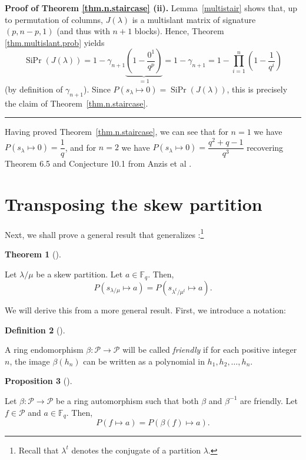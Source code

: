 \documentclass[numbers=enddot,12pt,final,onecolumn,notitlepage]{scrartcl}%
\theoremstyle{definition}
\newtheorem{theo}{Theorem}[section]
\newenvironment{theorem}[1][]
{\begin{theo}[#1]\begin{leftbar}}
{\end{leftbar}\end{theo}}
\newtheorem{prop}[theo]{Proposition}
\newenvironment{proposition}[1][]
{\begin{prop}[#1]\begin{leftbar}}
{\end{leftbar}\end{prop}}
\newtheorem{defi}[theo]{Definition}
\newenvironment{definition}[1][]
{\begin{defi}[#1]\begin{leftbar}}
{\end{leftbar}\end{defi}}
\newenvironment{proof}[1][Proof]{\noindent\textbf{#1.} }{\ \rule{0.5em}{0.5em}}
\let\prodnonlimits\prod
\renewcommand{\prod}{\prodnonlimits\limits}
\newcommand{\tup}[1]{\left( #1 \right)}
\theoremstyle{plainsl}
\begin{document}
\begin{proof}[Proof of Theorem \ref{thm.n.staircase} (ii)]
Lemma~\ref{multistair} shows that, up to permutation of columns,
$J(\lambda)$ is a multislant matrix of signature $(p, n-p, 1)$
(and thus with $n+1$ blocks).
Hence, Theorem \ref{thm.multislant.prob} yields
\[
\operatorname*{SiPr}\tup{J\tup{\lambda}}
= 1 - \gamma_{n+1} \underbrace{\tup{1 - \dfrac{0^1}{q^p}}}_{= 1}
= 1 - \gamma_{n+1}
= 1 - \prod_{i=1}^{n} \left(  1-\dfrac{1}{q^{i}}\right)
\]
(by definition of $\gamma_{n+1}$).
Since $P(s_{\lambda} \longmapsto 0) = \operatorname*{SiPr}\tup{J\tup{\lambda}}$,
this is precisely the claim of Theorem~\ref{thm.n.staircase}.
\end{proof}

Having proved Theorem~\ref{thm.n.staircase}, we can see that for $n=1$
we have
$P(s_{\lambda} \longmapsto 0) = \dfrac{1}{q}$, and for $n=2$ we have
$P(s_{\lambda} \longmapsto 0) = \dfrac{q^2+q-1}{q^3}$
recovering Theorem 6.5 and Conjecture 10.1 from Anzis et al \cite{Anzis18}.


\section{Transposing the skew partition}

Next, we shall prove a general result that generalizes \cite[Corollary
3.3]{Anzis18}:\footnote{Recall that $\lambda^{t}$ denotes the conjugate of a
partition $\lambda$.}

\begin{theorem}
\label{thm.transpose}Let $\lambda/\mu$ be a skew partition. Let $a\in
\mathbb{F}_{q}$. Then,
\[
P\left(  s_{\lambda/\mu}\mapsto a\right)  =P\left(  s_{\lambda^{t}/\mu^{t}%
}\mapsto a\right)  .
\]

\end{theorem}

We will derive this from a more general result. First, we introduce a notation:

\begin{definition}
A ring endomorphism $\beta:\mathcal{P}\rightarrow\mathcal{P}$ will be called
\emph{friendly} if for each positive integer $n$, the image $\beta\left(
h_{n}\right)  $ can be written as a polynomial in $h_{1},h_{2},\ldots,h_{n}$.
\end{definition}

\begin{proposition}
\label{prop.friendly-aut}Let $\beta:\mathcal{P}\rightarrow\mathcal{P}$ be a
ring automorphism such that both $\beta$ and $\beta^{-1}$ are friendly. Let
$f\in\mathcal{P}$ and $a\in\mathbb{F}_{q}$. Then,%
\[
P\left(  f\mapsto a\right)  =P\left(  \beta\left(  f\right)  \mapsto a\right)
.
\]

\end{proposition}
\end{document}
